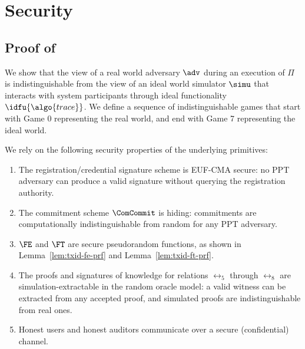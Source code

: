 \section{Security}\label{sec:txid-security}

\subsection{Proof of~}\label{sec:txid-bb-sec}

We show that the view of a real world adversary $\adv$ during an execution of
$\Pi$ is indistinguishable from the view of an ideal world simulator $\simu$
that interacts with system participants through ideal functionality
$\idfu{\algo{trace}}$. We define a sequence of indistinguishable games that
start with Game 0 representing the real world, and end with Game 7
representing the ideal world.

We rely on the following security properties of the underlying primitives:

\begin{enumerate}

  \item[(P1)] The registration/credential signature scheme is EUF-CMA secure:
    no PPT adversary can produce a valid signature without querying the
    registration authority.

  \item[(P2)] The commitment scheme $\ComCommit$ is hiding: commitments are
    computationally indistinguishable from random for any PPT adversary.

  \item[(P3)] $\FE$ and $\FT$ are secure pseudorandom functions, as shown in
    Lemma~\ref{lem:txid-fe-prf} and Lemma~\ref{lem:txid-ft-prf}.

  \item[(P4)] The proofs and signatures of knowledge for relations $\rel_5$
    through $\rel_8$ are simulation-extractable in the random oracle model: a
    valid witness can be extracted from any accepted proof, and simulated
    proofs are indistinguishable from real ones.

  \item[(P5)] Honest users and honest auditors communicate over a secure
    (confidential) channel.

\end{enumerate}

